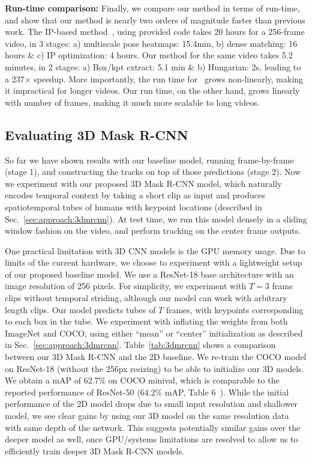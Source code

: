 \documentclass[10pt,twocolumn,letterpaper]{article}
\newcommand{\MODEL}[0]{3D Mask R-CNN}
\begin{document}
{\noindent \bf Run-time comparison:}\label{sec:expts:runtime}
Finally, we compare our method in terms of run-time, and show that our
method is nearly two orders of magnitude faster than previous work.
The IP-based method~\cite{iqbal2016pose},
using provided code 
takes 20 hours for a 256-frame video, in 3 stages: a) multiscale pose heatmaps:  15.4min, b) dense matching: 16 hours \& c) IP optimization: 4 hours.
Our method for the same video takes 5.2 minutes, in 2 stages: a) Box/kpt extract: 5.1 min \& b) Hungarian: 2s, leading to a
237$\times$ speedup.
More importantly, 
the run time for~\cite{iqbal2016pose} grows non-linearly,
making it impractical for longer videos.
Our run time, on the other hand, grows linearly with number of frames, 
making it much more scalable to long videos.



\subsection{Evaluating \MODEL{}}\label{sec:exp:3dmrcnn}




So far we have shown results with our baseline model, running frame-by-frame (stage 1),
and constructing the tracks on top of those predictions (stage 2). Now we experiment with our proposed \MODEL{} model, which naturally encodes temporal context by
taking a short clip as input and produces spatiotemporal tubes of humans with keypoint locations (described
in Sec.~\ref{sec:approach:3dmrcnn}). At test time, we run this model densely in a sliding window fashion
on the video, and perform tracking on the center frame outputs.

One practical limitation with 3D CNN models is the GPU memory usage. Due to limits of the current
hardware, we choose to experiment with a lightweight setup of our proposed baseline model.
We use a ResNet-18 base architecture with an image resolution of 256 pixels.
For simplicity, we experiment with $T=3$ frame clips without temporal
striding, although our model can work with arbitrary length clips.
Our model predicts tubes of $T$ frames, with keypoints corresponding to each box in the tube.
We experiment with inflating the weights from both ImageNet and COCO, using
either ``mean'' or ``center'' initialization as described in Sec.~\ref{sec:approach:3dmrcnn}.
Table~\ref{tab:3dmrcnn} shows a comparison between our 3D Mask R-CNN and the  2D baseline.
We re-train the COCO model on ResNet-18 (without the 256px resizing) to be able to initialize our 3D models.
We obtain a mAP of 62.7\% on COCO minival, which is comparable
to the reported performance of ResNet-50 (64.2\% mAP, Table 6~\cite{he2017mask}).
While the initial performance of the 2D model drops due to small input resolution and shallower model, we see clear gains by using our 3D model on the same
resolution data with same depth of the network. This suggests potentially similar gains over the deeper model as well, once GPU/systems limitations
are resolved to allow us to efficiently train deeper \MODEL{} models.
\end{document}
